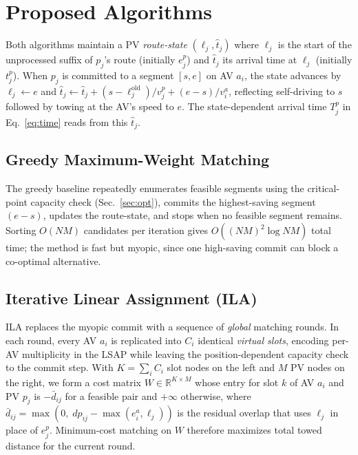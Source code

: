 \documentclass[sigconf]{acmart}
\begin{document}
\section{Proposed Algorithms}
\label{sec:algorithms}

Both algorithms maintain a PV \emph{route-state} $(\ell_j, \hat{t}_j)$ where $\ell_j$ is the start of the unprocessed suffix of $p_j$'s route (initially $e^p_j$) and $\hat{t}_j$ its arrival time at $\ell_j$ (initially $t^p_j$). When $p_j$ is committed to a segment $[s,e]$ on AV $a_i$, the state advances by $\ell_j \!\leftarrow\! e$ and $\hat{t}_j \!\leftarrow\! \hat{t}_j + (s\!-\!\ell_j^{\text{old}})/v^p_j + (e\!-\!s)/v^a_i$, reflecting self-driving to $s$ followed by towing at the AV's speed to $e$. The state-dependent arrival time $T^p_j$ in Eq.~\eqref{eq:time} reads from this $\hat{t}_j$.

\subsection{Greedy Maximum-Weight Matching}
\label{sec:greedy}
The greedy baseline repeatedly enumerates feasible segments using the critical-point capacity check (Sec.~\ref{sec:opt}), commits the highest-saving segment $(e\!-\!s)$, updates the route-state, and stops when no feasible segment remains. Sorting $O(NM)$ candidates per iteration gives $O((NM)^2\log NM)$ total time; the method is fast but myopic, since one high-saving commit can block a co-optimal alternative.

\subsection{Iterative Linear Assignment (ILA)}
\label{sec:ila}
ILA replaces the myopic commit with a sequence of \emph{global} matching rounds. In each round, every AV $a_i$ is replicated into $C_i$ identical \emph{virtual slots}, encoding per-AV multiplicity in the LSAP while leaving the position-dependent capacity check to the commit step. With $K\!=\!\sum_i C_i$ slot nodes on the left and $M$ PV nodes on the right, we form a cost matrix $W\!\in\!\mathbb{R}^{K\times M}$ whose entry for slot $k$ of AV $a_i$ and PV $p_j$ is $-\bar{d}_{ij}$ for a feasible pair and $+\infty$ otherwise, where $\bar{d}_{ij}=\max(0,\;dp_{ij}-\max(e^a_i,\ell_j))$ is the residual overlap that uses $\ell_j$ in place of $e^p_j$. Minimum-cost matching on $W$ therefore maximizes total towed distance for the current round.
\end{document}
